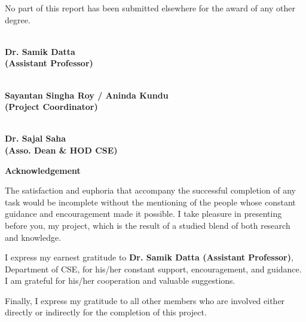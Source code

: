 \documentclass[12pt,a4paper]{report}
\begin{document}
\noindent No part of this report has been submitted elsewhere for the award of any other degree.
\vspace{2cm}
\begin{center}
    \underline{\hspace{5cm}}\\
    \textbf{Dr. Samik Datta}\\
    \textbf{(Assistant Professor)}

    \vspace{1cm}
    \underline{\hspace{5cm}}\\ 
    \textbf{Sayantan Singha Roy / Aninda Kundu}\\
    \textbf{(Project Coordinator)}

    \vspace{1cm}
    \underline{\hspace{5cm}}\\
    \textbf{Dr. Sajal Saha}\\
    \textbf{(Asso. Dean \& HOD CSE)}
\end{center}
\newpage

\thispagestyle{plain}
\begin{center}
    \Large{\fontsize{14}{16}\selectfont\textbf{Acknowledgement}}
\end{center}
\vspace{1.5cm}

\justifying
\noindent The satisfaction and euphoria that accompany the successful completion of any task would be incomplete without the mentioning of the people whose constant guidance and encouragement made it possible. I take pleasure in presenting before you, my project, which is the result of a studied blend of both research and knowledge.

\vspace{0.5cm}

\noindent I express my earnest gratitude to \textbf{Dr. Samik Datta (Assistant Professor)}, Department of CSE, for his/her constant support, encouragement, and guidance. I am grateful for his/her cooperation and valuable suggestions.

\vspace{0.5cm}

\noindent Finally, I express my gratitude to all other members who are involved either directly or indirectly for the completion of this project.
\newpage
\end{document}
